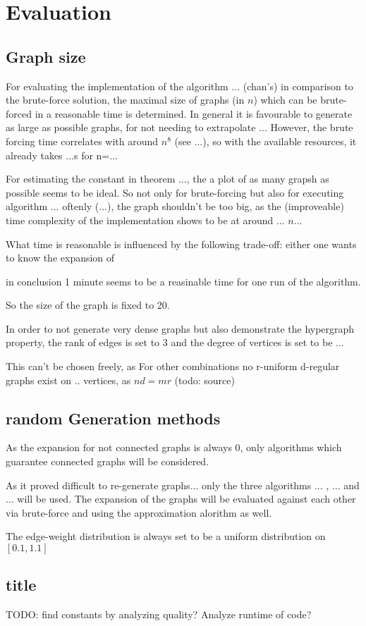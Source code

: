 \chapter{Evaluation}\label{chapter:Evaluation}

\section{Graph size}
For evaluating the implementation of the algorithm ... (chan's) in comparison to the brute-force solution, the maximal size of graphs (in $n$) which can be brute-forced in a reasonable time is determined. In general it is favourable to generate as large as possible graphs, for not needing to extrapolate ...
However, the brute forcing time correlates with around $n^8$ (see ...), so with the available resources, it already takes ...s for n=...

For estimating the constant in theorem ..., the a plot of as many grapsh as possible seems to be ideal. So not only for brute-forcing but also for executing algorithm ... oftenly (...), the graph shouldn't be too big, as the (improveable) time complexity of the implementation shows to be at around ... $n...$





What time is reasonable is influenced by the following trade-off: either one wants to know the expansion of  

in conclusion 1 minute seems to be a reasinable time for one run of the algorithm.


So the size of the graph is fixed to 20.

In order to not generate very dense graphs but also demonstrate the hypergraph property, the rank of edges is set to 3 and the degree of vertices is  set to be ... 

This can't be chosen freely, as For other combinations no r-uniform d-regular graphs exist on .. vertices, as $n d = m r$ (todo: source)


\section{random Generation methods}

As the expansion for not connected graphs is always 0, only algorithms which guarantee connected graphs will be considered.

As it proved difficult to re-generate graphs... only the three algorithms ... , ... and ... will be used. The expansion of the graphs will be evaluated against each other via brute-force and using the approximation alorithm as well.


The edge-weight distribution is always set to be a uniform distribution on $[0.1, 1.1]$
\section{title}




TODO: find constants by analyzing quality?
Analyze runtime of code? 
